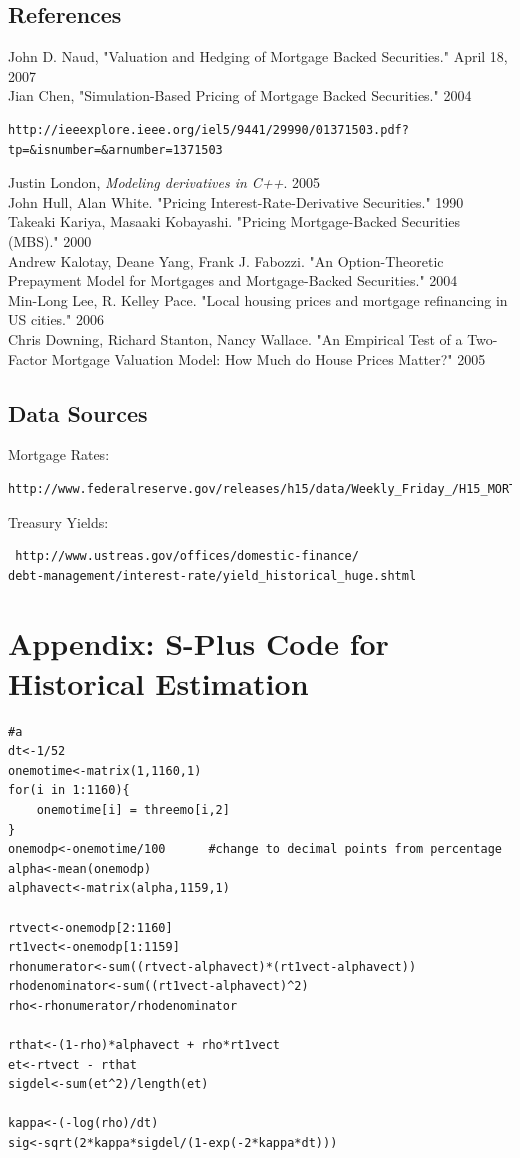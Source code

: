 \documentclass[10pt,letterpaper]{article}
\begin{document}
\subsection{References}
John D. Naud, "Valuation and Hedging of Mortgage Backed Securities." April 18, 2007\\
Jian Chen, "Simulation-Based Pricing of Mortgage Backed Securities." 2004 \begin{verbatim}http://ieeexplore.ieee.org/iel5/9441/29990/01371503.pdf?tp=&isnumber=&arnumber=1371503\end{verbatim}
Justin London, \textit{Modeling derivatives in C++}. 2005\\
John Hull, Alan White. "Pricing Interest-Rate-Derivative Securities." 1990\\
Takeaki Kariya, Masaaki Kobayashi. "Pricing Mortgage-Backed Securities (MBS)." 2000\\
Andrew Kalotay, Deane Yang, Frank J. Fabozzi. "An Option-Theoretic Prepayment Model for Mortgages and Mortgage-Backed Securities." 2004\\
Min-Long Lee, R. Kelley Pace. "Local housing prices and mortgage refinancing in US cities." 2006\\
Chris Downing, Richard Stanton, Nancy Wallace. "An Empirical Test of a Two-Factor Mortgage Valuation Model: How Much do House Prices Matter?" 2005\\

\subsection{Data Sources}
Mortgage Rates: \begin{verbatim}http://www.federalreserve.gov/releases/h15/data/Weekly_Friday_/H15_MORTG_NA.txt \end{verbatim}
Treasury Yields: \begin{verbatim} http://www.ustreas.gov/offices/domestic-finance/
debt-management/interest-rate/yield_historical_huge.shtml \end{verbatim}
\newpage
\section*{Appendix: S-Plus Code for Historical Estimation}
\begin{verbatim}
#a
dt<-1/52
onemotime<-matrix(1,1160,1)
for(i in 1:1160){
	onemotime[i] = threemo[i,2]
}
onemodp<-onemotime/100		#change to decimal points from percentage
alpha<-mean(onemodp)
alphavect<-matrix(alpha,1159,1)

rtvect<-onemodp[2:1160]
rt1vect<-onemodp[1:1159]
rhonumerator<-sum((rtvect-alphavect)*(rt1vect-alphavect))
rhodenominator<-sum((rt1vect-alphavect)^2)
rho<-rhonumerator/rhodenominator

rthat<-(1-rho)*alphavect + rho*rt1vect
et<-rtvect - rthat
sigdel<-sum(et^2)/length(et)

kappa<-(-log(rho)/dt)
sig<-sqrt(2*kappa*sigdel/(1-exp(-2*kappa*dt)))
\end{verbatim}
\end{document}
